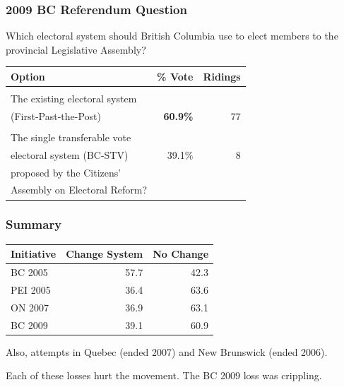 \documentclass[14pt,t,hyperref={colorlinks=true,urlcolor=red}]{beamer}
\begin{document}
\begin{frame}
\frametitle{2009 BC Referendum Question}

\begin{block}{}
\begin{center}
\begin{small}
Which electoral system should British Columbia use to elect members to
the provincial Legislative Assembly?
\end{small}
\begin{tabular}[c]{l|r|r}
Option & \% Vote & Ridings \\
\hline
 & & \\
\small{The existing electoral system} &  &\\
\small{(First-Past-the-Post)} &  \textbf{60.9\%} & 77 \\
\hline
 & & \\
\small{The single transferable vote} &   & \\
\small{electoral system (BC-STV)} &   39.1\% & 8 \\
\small{proposed by the Citizens'} &   &  \\
\small{Assembly on Electoral Reform?} &   &  \\
\hline
\end{tabular}
\end{center}
\end{block}


\end{frame}



\begin{frame}
\frametitle{Summary}


\begin{block}{}
\begin{center}
\begin{tabular}[c]{l|r|r}
Initiative & Change System & No Change \\
\hline
BC 2005 & 57.7 & 42.3 \\
PEI 2005 & 36.4 & 63.6 \\
ON 2007 & 36.9 & 63.1 \\
BC 2009 & 39.1 & 60.9 \\
\hline
\end{tabular}
\end{center}
\end{block}

Also, attempts in Quebec (ended 2007) and New Brunswick (ended 2006).

Each of these losses hurt the movement. The BC 2009 loss was
crippling.



\end{frame}
\end{document}
